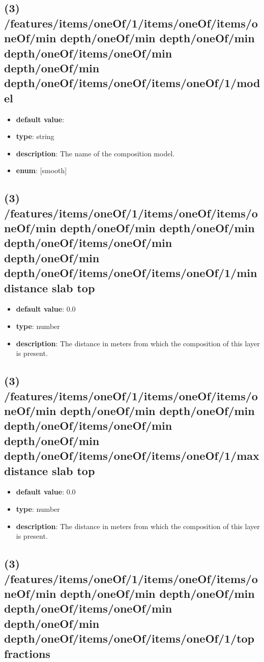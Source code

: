 \subsection{(3) /features/items/oneOf/1/items/oneOf/items/oneOf/min depth/oneOf/min depth/oneOf/min depth/oneOf/items/oneOf/min depth/oneOf/min depth/oneOf/items/oneOf/items/oneOf/1/model}
\begin{itemize}[leftmargin=3em]\item {\bf default value}: 
\item {\bf type}: string
\item {\bf description}: The name of the composition model.
\item {\bf enum}: [smooth]\end{itemize}\subsection{(3) /features/items/oneOf/1/items/oneOf/items/oneOf/min depth/oneOf/min depth/oneOf/min depth/oneOf/items/oneOf/min depth/oneOf/min depth/oneOf/items/oneOf/items/oneOf/1/min distance slab top}
\begin{itemize}[leftmargin=3em]\item {\bf default value}: 0.0
\item {\bf type}: number
\item {\bf description}: The distance in meters from which the composition of this layer is present.
\end{itemize}\subsection{(3) /features/items/oneOf/1/items/oneOf/items/oneOf/min depth/oneOf/min depth/oneOf/min depth/oneOf/items/oneOf/min depth/oneOf/min depth/oneOf/items/oneOf/items/oneOf/1/max distance slab top}
\begin{itemize}[leftmargin=3em]\item {\bf default value}: 0.0
\item {\bf type}: number
\item {\bf description}: The distance in meters from which the composition of this layer is present.
\end{itemize}\subsection{(3) /features/items/oneOf/1/items/oneOf/items/oneOf/min depth/oneOf/min depth/oneOf/min depth/oneOf/items/oneOf/min depth/oneOf/min depth/oneOf/items/oneOf/items/oneOf/1/top fractions}
